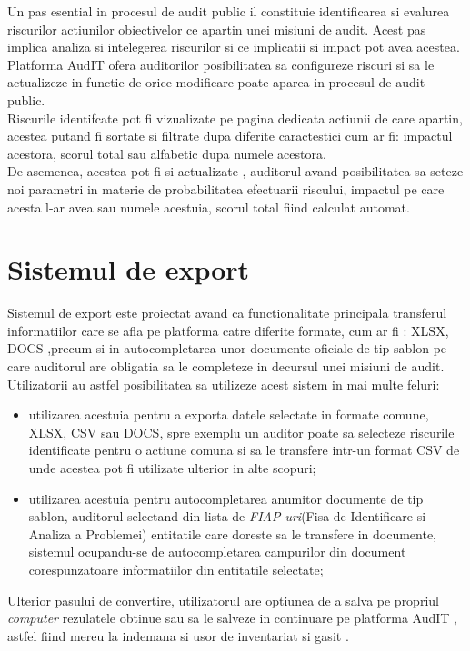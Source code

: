 Un pas esential in procesul de audit public il constituie identificarea si evalurea riscurilor actiunilor obiectivelor ce apartin unei misiuni de audit. Acest pas implica analiza si intelegerea riscurilor si ce implicatii si impact pot avea acestea.\\
 Platforma AudIT ofera auditorilor posibilitatea sa configureze riscuri si sa le actualizeze in functie de orice modificare poate aparea in procesul de audit public.\\
 Riscurile identifcate pot fi vizualizate pe pagina dedicata actiunii de care apartin, acestea putand fi sortate si filtrate dupa diferite caractestici cum ar fi: impactul acestora, scorul total sau alfabetic dupa numele acestora. \\
 De asemenea, acestea pot fi si actualizate , auditorul avand posibilitatea sa seteze noi parametri in materie de probabilitatea efectuarii riscului, impactul pe care acesta l-ar avea sau numele acestuia, scorul total fiind calculat automat.


\section{Sistemul de export}

Sistemul de export este proiectat avand ca functionalitate principala transferul informatiilor care se afla pe platforma catre diferite formate, cum ar fi : XLSX, DOCS ,precum si in autocompletarea unor documente oficiale de tip sablon pe care auditorul are obligatia sa le completeze in decursul unei misiuni de audit.\\
Utilizatorii au astfel posibilitatea sa utilizeze acest sistem in mai multe feluri:

\begin{itemize}

	\item utilizarea acestuia pentru a exporta datele selectate in formate comune, XLSX, CSV sau DOCS, 
	spre exemplu un auditor poate sa selecteze riscurile identificate pentru o actiune comuna si sa le transfere intr-un format CSV de unde acestea pot fi utilizate ulterior in alte scopuri;
	
	\item utilizarea acestuia pentru autocompletarea anumitor documente de tip sablon, auditorul selectand din lista de \textit{FIAP-uri}(Fisa de Identificare si Analiza a Problemei) entitatile care doreste sa le transfere in documente, sistemul ocupandu-se de autocompletarea campurilor din document corespunzatoare informatiilor din entitatile selectate;

\end{itemize}

Ulterior pasului de convertire, utilizatorul are optiunea de a salva pe propriul \textit{computer} 
rezulatele obtinue sau sa le salveze in continuare pe platforma AudIT , astfel fiind mereu la indemana si usor de inventariat si gasit .


